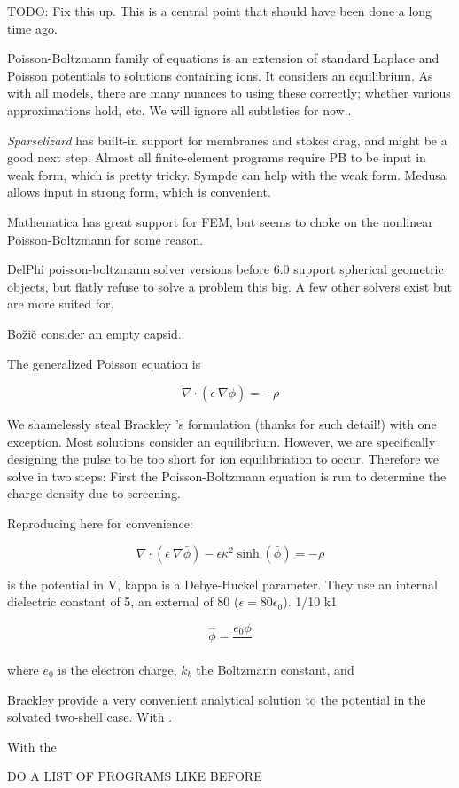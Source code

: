 \documentclass[paper.tex]{subfiles}
\begin{document}
\begin{autem}
	TODO: Fix this up. This is a central point that should have been done a long time ago. 
\end{autem}

Poisson-Boltzmann family of equations is an extension of standard Laplace and Poisson potentials to solutions containing ions. It considers an equilibrium. As with all models, there are many nuances to using these correctly; whether various approximations hold, etc. We will ignore all subtleties for now.. 

\textit{Sparselizard} has built-in support for membranes and stokes drag, and might be a good next step. Almost all finite-element programs require PB to be input in weak form, which is pretty tricky. Sympde can help with the weak form. Medusa allows input in strong form, which is convenient.

Mathematica has great support for FEM, but seems to choke on the nonlinear Poisson-Boltzmann for some reason. 

DelPhi poisson-boltzmann solver versions before 6.0 support spherical geometric objects, but flatly refuse to solve a problem this big. A few other solvers exist but are more suited for.

Božič \cite{How2012} consider an empty capsid.

The generalized Poisson equation is 

$$\nabla \cdot \left(\epsilon\ \nabla \bar\phi \right) = - \rho$$

We shamelessly steal Brackley \cite{Electrostatic2020}'s formulation (thanks for such detail!) with one exception. Most solutions consider an equilibrium. However, we are specifically designing the pulse to be too short for ion equilibriation to occur. Therefore we solve in two steps: First the Poisson-Boltzmann equation is run to determine the charge density due to screening.



Reproducing here for convenience:

$$\nabla \cdot \left(\epsilon\ \nabla \bar\phi \right) - \epsilon \kappa^2 \sinh(\bar\phi) = - \rho$$ 

is the potential in V, kappa is a Debye-Huckel parameter. They use an internal dielectric constant of 5, an external of 80 ($\epsilon =  80\epsilon_0$). 1/10 k1

$$\hat\phi = \frac{e_0 \phi}{}$$

where $e_0$ is the electron charge, $k_b$ the Boltzmann constant, and 

Brackley provide a very convenient analytical solution to the potential in the solvated two-shell case. With \cite{Deformation1991} \cite{Electrostatic2013}.

With the 


DO A LIST OF PROGRAMS LIKE BEFORE
\end{document}
